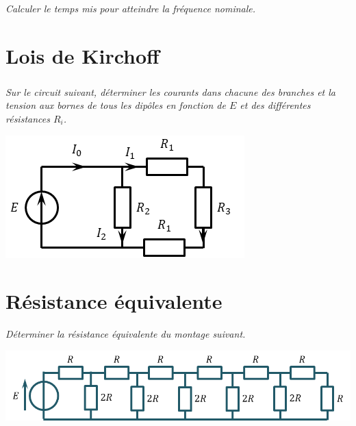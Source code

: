 \documentclass[10pt,fleqn]{article} %
\begin{document}
\begin{multicols}{2}
\subparagraph{}
\textit{Calculer le temps mis pour atteindre la fréquence nominale.}



\section*{Lois de Kirchoff}
\setcounter{exo}{0}

\subparagraph*{}
\textit{Sur le circuit suivant, déterminer les courants dans chacune des branches et la tension aux bornes de tous les dipôles en fonction de $E$ et des différentes résistances $R_i$.}
\begin{center}
\includegraphics[width=\linewidth]{images/fig_02}
\end{center}


\section*{Résistance équivalente}
\setcounter{exo}{0}
\textit{Déterminer la résistance équivalente du montage suivant.}
\begin{center}
\includegraphics[width=\linewidth]{images/fig_06}
\end{center}


\end{multicols}
\end{document}
